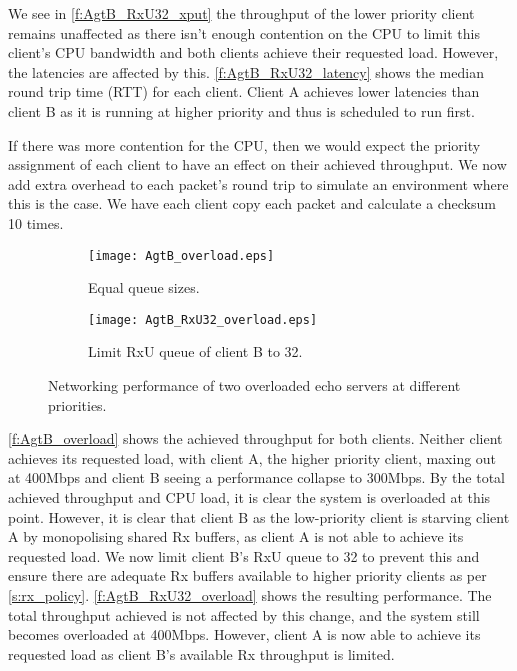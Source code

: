 We see in \autoref{f:AgtB_RxU32_xput} the throughput of the lower priority client remains unaffected as there isn't enough
contention on the CPU to limit this client's CPU bandwidth and both clients achieve their requested load.
However, the latencies are affected by this. \autoref{f:AgtB_RxU32_latency} shows the median round trip time (RTT)
for each client. Client A achieves lower latencies than client B as it is running
at higher priority and thus is scheduled to run first.

If there was more contention for the CPU, then we would expect the priority assignment of each client to have an effect
on their achieved throughput. We now add extra overhead to each packet's round trip to simulate an environment where
this is the case. We have each client copy each packet and calculate a checksum 10 times. 

\noindent\begin{figure}[H]
    \centering
	\begin{multicols}{2}
		\begin{subfigure}[b]{0.45\textwidth}
        \centering
        \texttt{[image: AgtB\_overload.eps]}
        \caption{Equal queue sizes.}
        \label{f:AgtB_overload}
    \end{subfigure}\qquad
    \begin{subfigure}[b]{0.45\textwidth}
        \centering
        \texttt{[image: AgtB\_RxU32\_overload.eps]}
        \caption{Limit RxU queue of client B to 32.}
        \label{f:AgtB_RxU32_overload}
    \end{subfigure}
\end{multicols}
\caption{Networking performance of two overloaded echo servers at different priorities.}
\label{f:AgtB_od}
\end{figure}

\autoref{f:AgtB_overload} shows the achieved throughput for both clients. Neither client achieves its requested load, with client A,
the higher priority client, maxing out at 400Mbps and client B seeing a performance collapse to 300Mbps. By the total achieved throughput
and CPU load, it is clear the system is overloaded at this point. However, it is clear that client B as the low-priority client is 
starving client A by monopolising shared Rx buffers, as client A is not able to achieve its requested load. We now limit client B's RxU queue
to 32 to prevent this and ensure there are adequate Rx buffers available to higher priority clients as per \autoref{s:rx_policy}. 
\autoref{f:AgtB_RxU32_overload} shows the resulting performance. The total throughput achieved is not affected by this change, and the
system still becomes overloaded at 400Mbps. However, client A is now able to achieve its requested load as client B's available
Rx throughput is limited. \\

